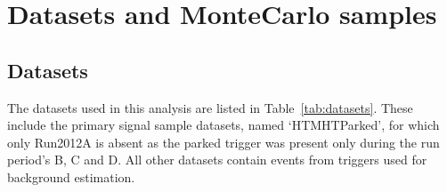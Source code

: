 \chapter{Datasets and MonteCarlo samples}
\label{ch:5_2}

\ifpdf
    \graphicspath{{Chapter5_2/Figs/Raster/}{Chapter5_2/Figs/PDF/}{Chapter5_2/Figs/}}
\else
    \graphicspath{{Chapter5_2/Figs/Vector/}{Chapter5_2/Figs/}}
\fi

\section{Datasets}

The datasets used in this analysis are listed in Table~\ref{tab:datasets}. These
include the primary signal sample datasets, named `HTMHTParked', for which only
Run2012A is absent as the parked trigger was present only during the 
run period's B, C and D. All other datasets contain events from triggers used for 
background estimation.

